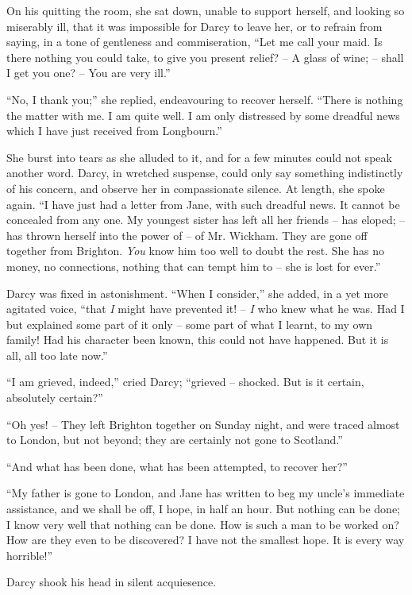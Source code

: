 On his quitting the room, she sat down, unable to
support herself, and looking so miserably ill, that it was
impossible for Darcy to leave her, or to refrain from
saying, in a tone of gentleness and commiseration, “Let
me call your maid. Is there nothing you could take, to
give you present relief? -- A glass of wine; -- shall I get
you one? -- You are very ill.”

“No, I thank you;” she replied, endeavouring to
recover herself. “There is nothing the matter with me.
I am quite well. I am only distressed by some dreadful
news which I have just received from Longbourn.”

She burst into tears as she alluded to it, and for a few
minutes could not speak another word. Darcy, in wretched
suspense, could only say something indistinctly of his
concern, and observe her in compassionate silence. At
length, she spoke again. “I have just had a letter from
Jane, with such dreadful news. It cannot be concealed
from any one. My youngest sister has left all her friends -- has
eloped; -- has thrown herself into the power of -- of
Mr. Wickham. They are gone off together from Brighton.
\textit{You} know him too well to doubt the rest. She has no
money, no connections, nothing that can tempt him to -- she
is lost for ever.”

Darcy was fixed in astonishment. “When I consider,”
she added, in a yet more agitated voice, “that \textit{I} might
have prevented it! -- \textit{I} who knew what he was. Had I but
explained some part of it only -- some part of what I learnt,
to my own family! Had his character been known, this
could not have happened. But it is all, all too late
now.”

“I am grieved, indeed,” cried Darcy; “grieved -- shocked.
But is it certain, absolutely certain?”

“Oh yes! -- They left Brighton together on Sunday
night, and were traced almost to London, but not beyond;
they are certainly not gone to Scotland.”

“And what has been done, what has been attempted,
to recover her?”

“My father is gone to London, and Jane has written
to beg my uncle’s immediate assistance, and we shall be
off, I hope, in half an hour. But nothing can be done;
I know very well that nothing can be done. How is such
a man to be worked on? How are they even to be discovered?
I have not the smallest hope. It is every way
horrible!”

Darcy shook his head in silent acquiesence.


